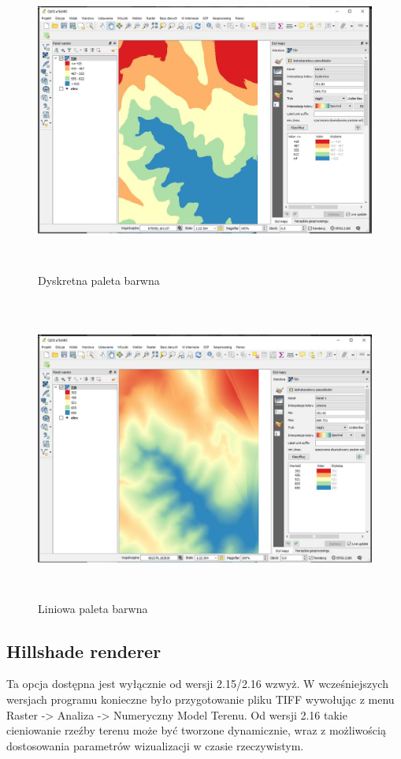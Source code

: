 \documentclass[12pt,a4paper]{book}
\begin{document}
\begin{figure}[!ht]
	\centering
\includegraphics[height=10cm]{007-raster-dyskretna.png}
\caption{Dyskretna paleta barwna}
\end{figure}
\begin{figure}[!ht]
	\centering
\includegraphics[height=10cm]{007-raster-liniowa.jpg}
\caption{Liniowa paleta barwna}
\end{figure}

\subsection{Hillshade renderer}
Ta opcja dostępna jest wyłącznie od wersji 2.15/2.16 wzwyż. W wcześniejszych wersjach programu konieczne było przygotowanie pliku TIFF wywołując z menu Raster -{\textgreater} Analiza -{\textgreater} Numeryczny Model Terenu. Od wersji 2.16 takie cieniowanie rzeźby terenu może być tworzone dynamicznie, wraz z możliwością dostosowania parametrów wizualizacji w czasie rzeczywistym.
\end{document}
